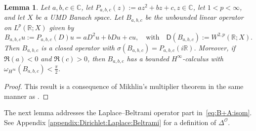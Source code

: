 \documentclass[12pt,a4paper, reqno]{amsart}
\theoremstyle{plain}
\newtheorem{lemma}[theorem]{Lemma}
\theoremstyle{definition}
\theoremstyle{remark}
\numberwithin{equation}{section}
\newcommand{\1}{\mathbbm{1}}
\newcommand{\R}{\ensuremath{\mathbb{R}}}
\newcommand{\C}{\ensuremath{\mathbb{C}}}
\newcommand{\calO}{\ensuremath{\mathcal{O}}}
\newcommand{\sfD}{\ensuremath{\mathsf{D}}}
\begin{document}
\begin{lemma}\label{PruSim_B}
        Let $a,b,c \in \C$, let $P_{a,b,c}(z):= az^2+bz+c, z\in \C$, let $1<p<\infty$, and let $X$ be a UMD Banach space. 
        Let $B_{a,b,c}$ be the unbounded linear operator on $L^p(\R;X)$ given by
        \[
        B_{a,b,c}u:=P_{a,b,c}(D)u=aD^2u+bDu+cu,
        \quad \text{with}\quad \sfD(B_{a,b,c}):=
        W^{2,p}(\R;X).
        \]
        Then 
        $B_{a,b,c}$ is a closed operator with
        $\sigma(B_{a,b,c})= P_{a,b,c}(i\R)$. Moreover, if $\Re(a)<0 $ and $\Re(c)>0$, then $B_{a,b,c}$ has a bounded $H^\infty$-calculus with $\omega_{H^\infty}(B_{a,b,c})<\frac{\pi}{2}$.  
    \end{lemma}
    \begin{proof}
      This result is a consequence of Mikhlin's multiplier theorem \cite[Theorem 5.3.18]{aibs1}
      in the same manner as \cite[Theorem~5.1]{GalVer2017}. 
    \end{proof}

The next lemma addresses the Laplace--Beltrami operator part in~\eqref{eq:B+A:isom}. See Appendix \ref{appendix:Dirichlet:Laplace:Beltrami} for a definition of $\Delta^\calO$.
\end{document}
